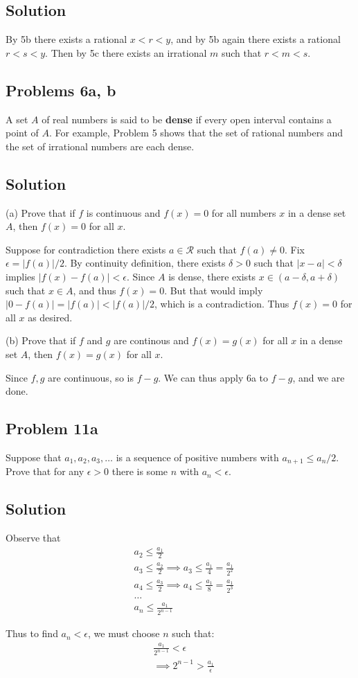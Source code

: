 \subsection*{Solution}
By 5b there exists a rational $x<r<y$, and by 5b again there exists a
rational $r<s<y$. Then by 5c there exists an irrational $m$ such that
$r<m<s$.

\subsection*{Problems 6a, b}
A set $A$ of real numbers is said to be \textbf{dense} if every open
interval contains a point of $A$. For example, Problem 5 shows that
the set of rational numbers and the set of irrational numbers are each
dense.

\subsection*{Solution}

(a) Prove that if $f$ is continuous and $f(x)=0$ for all numbers $x$
in a dense set $A$, then $f(x)=0$ for all $x$.

\vs

Suppose for contradiction there exists $a\in\mathcal{R}$ such that
$f(a)\neq0$. Fix $\epsilon=|f(a)|/2$. By continuity definition, there exists
$\delta>0$ such that $|x-a|<\delta$ implies $|f(x)-f(a)|<\epsilon$. Since
$A$ is dense, there exists $x\in(a-\delta, a+\delta)$ such that
$x\in A$, and thus $f(x)=0$. But that would imply
$|0-f(a)|=|f(a)|<|f(a)|/2$, which is a contradiction. Thus $f(x)=0$
for all $x$ as desired.

\vs

(b) Prove that if $f$ and $g$ are continous and $f(x)=g(x)$ for all
$x$ in a dense set $A$, then $f(x)=g(x)$ for all $x$.

\vs

Since $f,g$ are continuous, so is $f-g$. We can thus apply 6a to
$f-g$, and we are done.

\subsection*{Problem 11a}
Suppose that $a_{1}, a_{2}, a_{3}, \ldots$ is a sequence of positive
numbers with $a_{n+1}\leq a_{n}/2$. Prove that for any $\epsilon>0$ there is
some $n$ with $a_{n}<\epsilon$.

\subsection*{Solution}
Observe that
\begin{align*}
  &a_2\leq \frac{a_1}{2}\\
  &a_3\leq \frac{a_2}{2}\implies a_3\leq \frac{a_1}{4}=\frac{a_1}{2^2}\\
  &a_4\leq \frac{a_3}{2}\implies a_4\leq\frac{a_1}{8}=\frac{a_1}{2^3}\\
  &\ldots\\
  &a_n\leq \frac{a_1}{2^{n-1}}
\end{align*}

Thus to find $a_n<\epsilon$, we must choose $n$ such that:
\begin{align*}
  &\frac{a_1}{2^{n-1}}<\epsilon\\
  &\implies 2^{n-1}>\frac{a_1}{\epsilon}
\end{align*}

